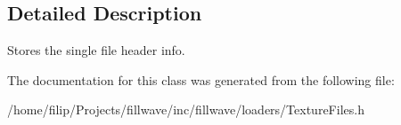 \subsection{Detailed Description}
Stores the single file header info. 

The documentation for this class was generated from the following file\+:\begin{DoxyCompactItemize}
\item 
/home/filip/\+Projects/fillwave/inc/fillwave/loaders/Texture\+Files.\+h\end{DoxyCompactItemize}
